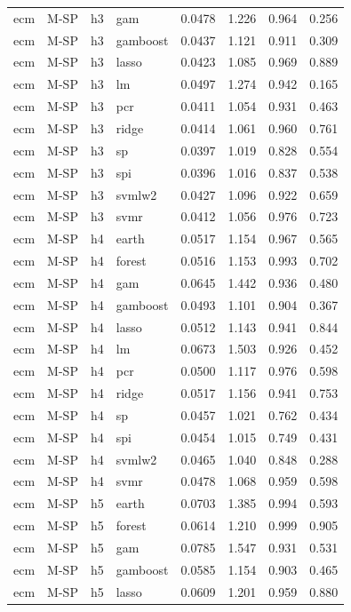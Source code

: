 \begin{ThreePartTable}
\begin{longtable}[t]{llclcccc}
ecm & M-SP & h3 & gam & 0.0478 & 1.226 & 0.964 & 0.256\\
ecm & M-SP & h3 & gamboost & 0.0437 & 1.121 & 0.911 & 0.309\\
ecm & M-SP & h3 & lasso & 0.0423 & 1.085 & 0.969 & 0.889\\
ecm & M-SP & h3 & lm & 0.0497 & 1.274 & 0.942 & 0.165\\
ecm & M-SP & h3 & pcr & 0.0411 & 1.054 & 0.931 & 0.463\\
ecm & M-SP & h3 & ridge & 0.0414 & 1.061 & 0.960 & 0.761\\
ecm & M-SP & h3 & sp & 0.0397 & 1.019 & 0.828 & 0.554\\
ecm & M-SP & h3 & spi & 0.0396 & 1.016 & 0.837 & 0.538\\
ecm & M-SP & h3 & svmlw2 & 0.0427 & 1.096 & 0.922 & 0.659\\
ecm & M-SP & h3 & svmr & 0.0412 & 1.056 & 0.976 & 0.723\\
\addlinespace
ecm & M-SP & h4 & earth & 0.0517 & 1.154 & 0.967 & 0.565\\
ecm & M-SP & h4 & forest & 0.0516 & 1.153 & 0.993 & 0.702\\
ecm & M-SP & h4 & gam & 0.0645 & 1.442 & 0.936 & 0.480\\
ecm & M-SP & h4 & gamboost & 0.0493 & 1.101 & 0.904 & 0.367\\
ecm & M-SP & h4 & lasso & 0.0512 & 1.143 & 0.941 & 0.844\\
ecm & M-SP & h4 & lm & 0.0673 & 1.503 & 0.926 & 0.452\\
ecm & M-SP & h4 & pcr & 0.0500 & 1.117 & 0.976 & 0.598\\
ecm & M-SP & h4 & ridge & 0.0517 & 1.156 & 0.941 & 0.753\\
ecm & M-SP & h4 & sp & 0.0457 & 1.021 & 0.762 & 0.434\\
ecm & M-SP & h4 & spi & 0.0454 & 1.015 & 0.749 & 0.431\\
ecm & M-SP & h4 & svmlw2 & 0.0465 & 1.040 & 0.848 & 0.288\\
ecm & M-SP & h4 & svmr & 0.0478 & 1.068 & 0.959 & 0.598\\
\addlinespace
ecm & M-SP & h5 & earth & 0.0703 & 1.385 & 0.994 & 0.593\\
ecm & M-SP & h5 & forest & 0.0614 & 1.210 & 0.999 & 0.905\\
ecm & M-SP & h5 & gam & 0.0785 & 1.547 & 0.931 & 0.531\\
ecm & M-SP & h5 & gamboost & 0.0585 & 1.154 & 0.903 & 0.465\\
ecm & M-SP & h5 & lasso & 0.0609 & 1.201 & 0.959 & 0.880\\

\end{longtable}
\end{ThreePartTable}

